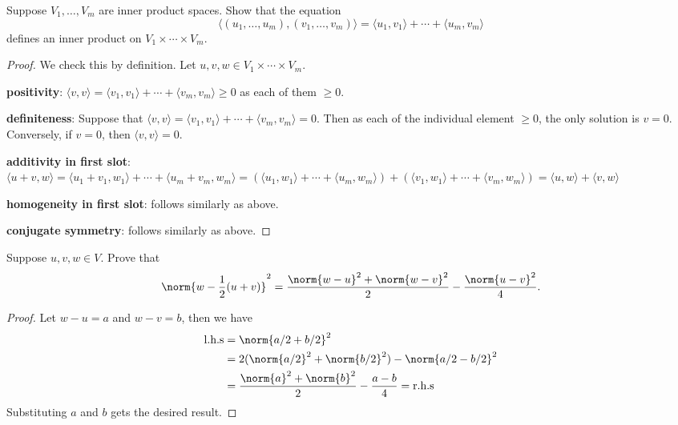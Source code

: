 \documentclass{extarticle}
\begin{document}
\begin{problem}{29}
    Suppose \(V_1, \ldots, V_m\) are inner product spaces. Show that the equation 
    \[\langle (u_1, \ldots, u_m), (v_1, \ldots, v_m) \rangle = \langle u_1,v_1 \rangle 
    + \cdots + \langle u_m,v_m \rangle\]
    defines an inner product on \(V_1 \times \cdots \times V_m\).
\end{problem}

\begin{proof}
We check this by definition. Let \(u, v, w \in V_1 \times \cdots \times V_m\). 

\textbf{positivity}: \(\langle v,v \rangle 
= \langle v_1,v_1 \rangle + \cdots + \langle v_m,v_m \rangle \geq 0 \) 
as each of them \(\geq 0\). 

\textbf{definiteness}: Suppose that \(\langle v,v \rangle 
= \langle v_1,v_1 \rangle + \cdots + \langle v_m,v_m \rangle = 0 \). Then as each of the individual 
element \(\geq 0\), the only solution is \(v = 0\). Conversely, if \(v = 0\), then \(\langle v,v \rangle = 0\). 

\textbf{additivity in first slot}: \(\langle u+v,w \rangle 
= \langle u_1 + v_1, w_1 \rangle + \cdots + \langle u_m + v_m, w_m \rangle 
= (\langle u_1,w_1 \rangle + \cdots + \langle u_m,w_m \rangle) 
+ (\langle v_1,w_1 \rangle + \cdots + \langle v_m,w_m \rangle) 
= \langle u,w \rangle + \langle v,w \rangle\) 

\textbf{homogeneity in first slot}: follows similarly as above. 

\textbf{conjugate symmetry}: follows similarly as above. 
\end{proof}

\begin{problem}{31}
    Suppose \(u, v, w \in V\). Prove that 
    \[\norm{w - \frac{1}{2}(u+v)}^2 = \frac{\norm{w - u}^2 + \norm{w - v}^2}{2} - \frac{\norm{u-v}^2}{4}.\]
\end{problem}

\begin{proof}
Let \(w - u = a\) and \(w - v = b\), then we have 
\begin{align*}
    \text{l.h.s} 
    &= \norm{ a/2  + b/2  }^2 \\ 
    &=  2(\norm{a/2}^2 + \norm{b/2}^2) - \norm{a/2 - b/2}^2 \\ 
    &= \frac{\norm{a}^2 + \norm{b}^2}{2} - \frac{a - b}{4} = \text{r.h.s} 
\end{align*}
Substituting \(a\) and \(b\) gets the desired result. 
\end{proof}
\end{document}
